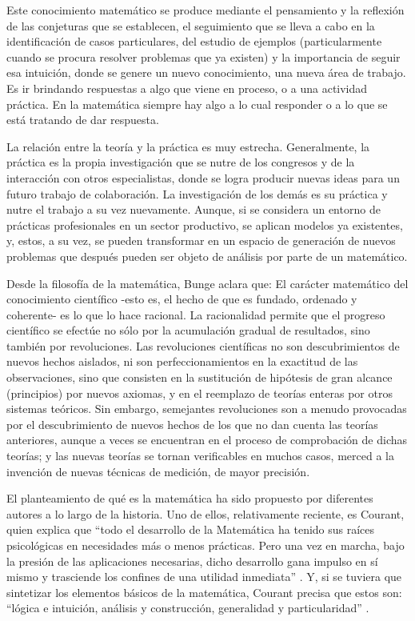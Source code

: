 Este conocimiento matemático se produce mediante el pensamiento y la reflexión de las conjeturas que se establecen, el seguimiento que se lleva a cabo en la identificación de casos particulares, del estudio de ejemplos (particularmente cuando se procura resolver problemas que ya existen) y la importancia de seguir esa intuición, donde se genere un nuevo conocimiento, una nueva área de trabajo. Es ir brindando respuestas a algo que viene en proceso, o a una actividad práctica. En la matemática siempre hay algo a lo cual responder o a lo que se está tratando de dar respuesta.   

La relación entre la teoría y la práctica es muy estrecha. Generalmente, la práctica es la propia investigación que se nutre de los congresos y de la interacción con otros especialistas, donde se logra producir nuevas ideas para un futuro trabajo de colaboración. La investigación de los demás es su práctica y nutre el trabajo a su vez nuevamente. Aunque, si se considera un entorno de prácticas profesionales en un sector productivo, se aplican modelos ya existentes, y, estos, a su vez, se pueden transformar en un espacio de generación de nuevos problemas que después pueden ser objeto de análisis por parte de un matemático. 

    Desde la filosofía de la matemática, Bunge \cite{Bunge1960} aclara que:   
    El carácter matemático del conocimiento científico -esto es, el hecho de que es fundado, ordenado y coherente- es lo que lo hace racional. La racionalidad permite que el progreso científico se efectúe no sólo por la acumulación gradual de resultados, sino también por revoluciones. Las revoluciones científicas no son descubrimientos de nuevos hechos aislados, ni son perfeccionamientos en la exactitud de las observaciones, sino que consisten en la sustitución de hipótesis de gran alcance (principios) por nuevos axiomas, y en el reemplazo de teorías enteras por otros sistemas teóricos.  Sin embargo, semejantes revoluciones son a menudo provocadas por el descubrimiento de nuevos hechos de los que no dan cuenta las teorías anteriores, aunque a veces se encuentran en el proceso de comprobación de dichas teorías; y las nuevas teorías se tornan verificables en muchos casos, merced a la invención de nuevas técnicas de medición, de mayor precisión. 

El planteamiento de qué es la matemática ha sido propuesto por diferentes autores a lo largo de la historia. Uno de ellos, relativamente reciente, es Courant, quien explica que “todo el desarrollo de la Matemática ha tenido sus raíces psicológicas en necesidades más o menos prácticas. Pero una vez en marcha, bajo la presión de las aplicaciones necesarias, dicho desarrollo gana impulso en sí mismo y trasciende los confines de una utilidad inmediata” \cite{CourantRobbins1979}. Y, si se tuviera que sintetizar los elementos básicos de la matemática, Courant precisa que estos son: “lógica e intuición, análisis y construcción, generalidad y particularidad” \cite{CourantRobbins1979}.



